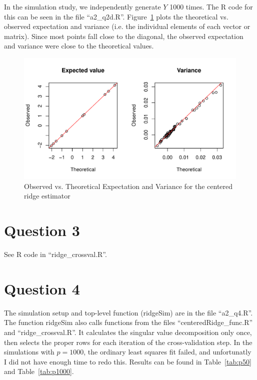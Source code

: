 \documentclass{article}\usepackage[]{graphicx}\usepackage[]{color}
\makeatletter
\def\maxwidth{ %
  \ifdim\Gin@nat@width>\linewidth
    \linewidth
  \else
    \Gin@nat@width
  \fi
}
\newenvironment{knitrout}{}{} %
\makeatother
\begin{document}
\vspace{0.5in}

In the simulation study, we independently generate $Y$ 1000 times.  The R code for this can be seen in the file ``a2\_q2d.R''. Figure~\ref{fig:q2_graphs} plots the theoretical vs. observed expectation and variance (i.e. the individual elements of each vector or matrix).  Since most points fall close to the diagonal, the observed expectation and variance were close to the theoretical values.


\begin{knitrout}
\color{fgcolor}\begin{figure}
\includegraphics[width=\maxwidth]{figure/q2_graphs-1} \caption[Observed vs]{Observed vs. Theoretical Expectation and Variance for the centered ridge estimator}\label{fig:q2_graphs}
\end{figure}


\end{knitrout}


\section*{Question 3}
See R code in ``ridge\_crossval.R''.

\section*{Question 4}
The simulation setup and top-level function (ridgeSim) are in the file ``a2\_q4.R''.  The function ridgeSim also calls functions from the files ``centeredRidge\_func.R'' and ``ridge\_crossval.R''.  It calculates the singular value decomposition only once, then selects the proper rows for each iteration of the cross-validation step.  In the simulations with $p=1000$, the ordinary least squares fit failed, and unfortunatly I did not have enough time to redo this.  Results can be found in Table~\ref{tab:p50} and Table~\ref{tab:p1000}.
\end{document}
